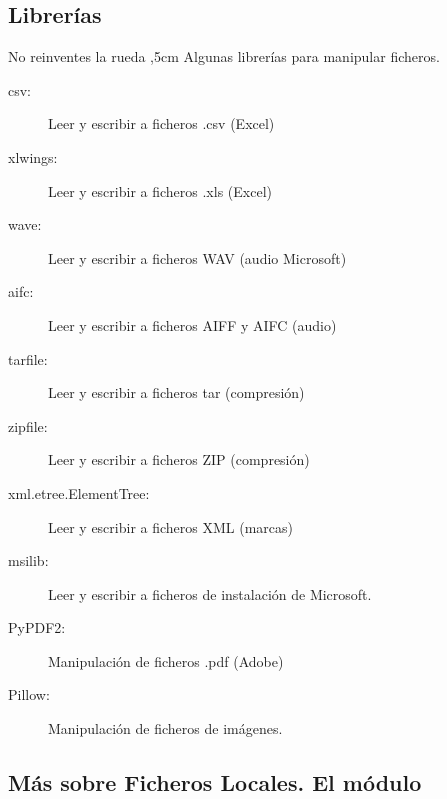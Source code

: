 \documentclass[10pt, envcountsect , spanish]{beamer}
\begin{document}
\subsection{Librerías}

\begin{frame}[fragile]{No reinventes la rueda} 
,5cm Algunas librerías para manipular ficheros.

\begin{description}
\item[csv:] Leer y escribir a ficheros .csv (Excel)
\item[xlwings:] Leer y escribir a ficheros .xls (Excel)
\item[wave:]  Leer y escribir a ficheros WAV (audio Microsoft)
\item[aifc:] Leer y escribir a ficheros AIFF y AIFC  (audio)
\item[tarfile:] Leer y escribir a ficheros tar (compresión)
\item[zipfile:] Leer y escribir a ficheros ZIP (compresión)
\item[xml.etree.ElementTree:] Leer y escribir a ficheros XML (marcas)
\item[msilib:] Leer y escribir a ficheros de instalación de Microsoft.
\item[PyPDF2:] Manipulación de ficheros .pdf (Adobe)
\item[Pillow:] Manipulación de ficheros de imágenes.
\end{description}
\end{frame}




\subsection{Más sobre Ficheros Locales. El módulo }
\end{document}

